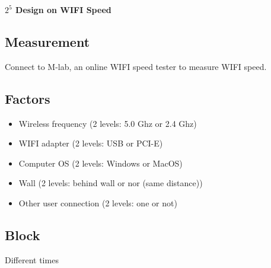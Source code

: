 \documentclass[11pt,letterpaper]{article}
\begin{document}
\noindent \textbf{$2^5$ Design on WIFI Speed}

\subsection*{Measurement}
\noindent Connect to M-lab, an online WIFI speed tester to measure WIFI speed. 

\subsection*{Factors}
\begin{itemize}
  \item Wireless frequency (2 levels: 5.0 Ghz or 2.4 Ghz)
  \item WIFI adapter (2 levels: USB or PCI-E)
  \item Computer OS (2 levels: Windows or MacOS)
  \item Wall (2 levels: behind wall or nor (same distance))
  \item Other user connection (2 levels: one or not)
\end{itemize}

\subsection*{Block}
\noindent Different times 
\end{document}
